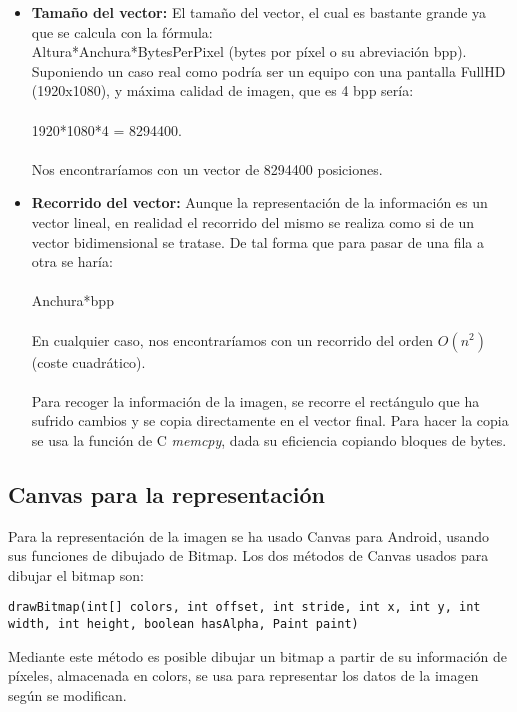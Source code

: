 \begin{itemize}
\item \textbf{Tamaño del vector:} El tamaño del vector, el cual es bastante grande ya que se calcula con la fórmula:\\
Altura*Anchura*BytesPerPixel (bytes por píxel o su abreviación bpp).\\
Suponiendo un caso real como podría ser un equipo con una pantalla FullHD (1920x1080), y máxima calidad de imagen, que es 4 bpp sería:\\
\\
1920*1080*4 = 8294400.\\
\\
Nos encontraríamos con un vector de 8294400 posiciones.
\item \textbf{Recorrido del vector:} Aunque la representación de la información es un vector lineal, en realidad el recorrido del mismo se realiza como si de un vector bidimensional se tratase. De tal forma que para pasar de una fila a otra se haría:\\
\\
Anchura*bpp\\
\\
En cualquier caso, nos encontraríamos con un recorrido del orden $O(n^2)$ (coste cuadrático).\\
\\
Para recoger la información de la imagen, se recorre el rectángulo que ha sufrido cambios y se copia directamente en el vector final. Para hacer la copia se usa la función de C \emph{memcpy}, dada su eficiencia copiando bloques de bytes.\\
\end{itemize}

\subsection{Canvas para la representación}

Para la representación de la imagen se ha usado Canvas para Android, usando sus funciones de dibujado de Bitmap. Los dos métodos de Canvas usados para dibujar el bitmap son:\\

\begin{lstlisting}
drawBitmap(int[] colors, int offset, int stride, int x, int y, int width, int height, boolean hasAlpha, Paint paint)
\end{lstlisting}

Mediante este método es posible dibujar un bitmap a partir de su información de píxeles, almacenada en colors, se usa para representar los datos de la imagen según se modifican.\\

